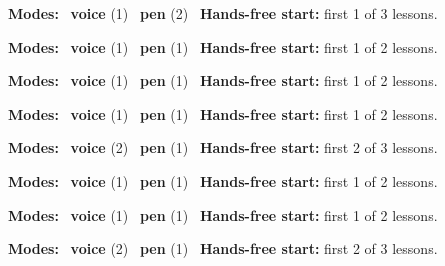 \expandafter\def\csname hlchaptermodality13\endcsname{%
  {\small\noindent
    \textbf{Modes:} \hlvoicesign{}~\textbf{voice} (1) \quad \hlpensign{}~\textbf{pen} (2)\quad
    \hlvoicesign{}~\textbf{Hands-free start:} first 1 of 3 lessons.%
    \par}\medskip
}

\expandafter\def\csname hlchaptermodality14\endcsname{%
  {\small\noindent
    \textbf{Modes:} \hlvoicesign{}~\textbf{voice} (1) \quad \hlpensign{}~\textbf{pen} (1)\quad
    \hlvoicesign{}~\textbf{Hands-free start:} first 1 of 2 lessons.%
    \par}\medskip
}

\expandafter\def\csname hlchaptermodality15\endcsname{%
  {\small\noindent
    \textbf{Modes:} \hlvoicesign{}~\textbf{voice} (1) \quad \hlpensign{}~\textbf{pen} (1)\quad
    \hlvoicesign{}~\textbf{Hands-free start:} first 1 of 2 lessons.%
    \par}\medskip
}

\expandafter\def\csname hlchaptermodality16\endcsname{%
  {\small\noindent
    \textbf{Modes:} \hlvoicesign{}~\textbf{voice} (1) \quad \hlpensign{}~\textbf{pen} (1)\quad
    \hlvoicesign{}~\textbf{Hands-free start:} first 1 of 2 lessons.%
    \par}\medskip
}

\expandafter\def\csname hlchaptermodality17\endcsname{%
  {\small\noindent
    \textbf{Modes:} \hlvoicesign{}~\textbf{voice} (2) \quad \hlpensign{}~\textbf{pen} (1)\quad
    \hlvoicesign{}~\textbf{Hands-free start:} first 2 of 3 lessons.%
    \par}\medskip
}

\expandafter\def\csname hlchaptermodality18\endcsname{%
  {\small\noindent
    \textbf{Modes:} \hlvoicesign{}~\textbf{voice} (1) \quad \hlpensign{}~\textbf{pen} (1)\quad
    \hlvoicesign{}~\textbf{Hands-free start:} first 1 of 2 lessons.%
    \par}\medskip
}

\expandafter\def\csname hlchaptermodality19\endcsname{%
  {\small\noindent
    \textbf{Modes:} \hlvoicesign{}~\textbf{voice} (1) \quad \hlpensign{}~\textbf{pen} (1)\quad
    \hlvoicesign{}~\textbf{Hands-free start:} first 1 of 2 lessons.%
    \par}\medskip
}

\expandafter\def\csname hlchaptermodality20\endcsname{%
  {\small\noindent
    \textbf{Modes:} \hlvoicesign{}~\textbf{voice} (2) \quad \hlpensign{}~\textbf{pen} (1)\quad
    \hlvoicesign{}~\textbf{Hands-free start:} first 2 of 3 lessons.%
    \par}\medskip
}

